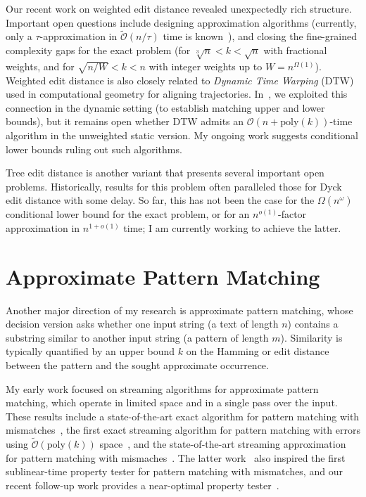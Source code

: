 \documentclass[a4paper,11pt]{article}
\newcommand{\Oh}{\mathcal{O}}
\newcommand{\Ohtilde}{\tilde{\mathcal{O}}}
\begin{document}
Our recent work on weighted edit distance revealed unexpectedly rich structure. 
Important open questions include designing approximation algorithms (currently, only a $\tau$-approximation in $\Ohtilde(n/\tau)$ time is known~\cite{Kus19}), and closing the fine-grained complexity gaps for the exact problem (for $\sqrt[3]{n} < k < \sqrt{n}$ with fractional weights, and for $\sqrt{n/W} < k < n$ with integer weights up to $W=n^{\Omega(1)}$). 
Weighted edit distance is also closely related to \emph{Dynamic Time Warping} (DTW) used in computational geometry for aligning trajectories.
In~\cite{BFH24}, we exploited this connection in the dynamic setting (to establish matching upper and lower bounds), but it remains open whether DTW admits an $\Oh(n+\mathrm{poly}(k))$-time algorithm in the unweighted static version.
My ongoing work suggests conditional lower bounds ruling out such algorithms.

Tree edit distance is another variant that presents several important open problems. 
Historically, results for this problem often paralleled those for Dyck edit distance with some delay.
So far, this has not been the case for the $\Omega(n^\omega)$ conditional lower bound for the exact problem, or for an $n^{o(1)}$-factor approximation in $n^{1+o(1)}$ time; I am currently working to achieve the latter.

\section{Approximate Pattern Matching}
Another major direction of my research is approximate pattern matching, whose decision version asks whether one input string (a text of length $n$) contains a substring similar to another input string (a pattern of length $m$).
Similarity is typically quantified by an upper bound $k$ on the Hamming or edit distance between the pattern and the sought approximate occurrence. 

My early work focused on streaming algorithms for approximate pattern matching, which operate in limited space and in a single pass over the input. 
These results include a state-of-the-art exact algorithm for pattern matching with mismatches~\cite{SODA2019}, the first exact streaming algorithm for pattern matching with errors using $\Ohtilde(\mathrm{poly}(k))$ space~\cite{aFOCS2021}, and the state-of-the-art streaming approximation for pattern matching with mismaches~\cite{STOC2020}.
The latter work~\cite{STOC2020} also inspired the first sublinear-time property tester for pattern matching with mismatches, and our recent follow-up work provides a near-optimal property tester~\cite{JK25}. 
\end{document}
